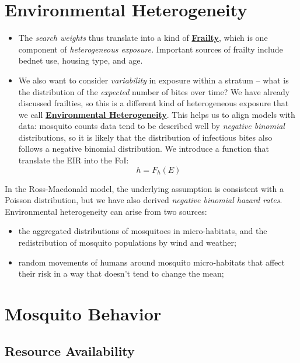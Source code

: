 \documentclass[
]{book}
\begin{document}
\hypertarget{environmental-heterogeneity}{%
\section{Environmental Heterogeneity}\label{environmental-heterogeneity}}

\begin{itemize}
\item
  The \emph{search weights} thus translate into a kind of \textbf{\protect\hyperlink{frailtyCh}{Frailty}}, which is one component of \emph{heterogeneous exposure.} Important sources of frailty include bednet use, housing type, and age.
\item
  We also want to consider \emph{variability} in exposure within a stratum -- what is the distribution of the \emph{expected} number of bites over time? We have already discussed frailties, so this is a different kind of heterogeneous exposure that we call \textbf{\protect\hyperlink{environmentalHeterogeneity}{Environmental Heterogeneity}}. This helps us to align models with data: mosquito counts data tend to be described well by \emph{negative binomial} distributions, so it is likely that the distribution of infectious bites also follows a negative binomial distribution. We introduce a function that translate the EIR into the FoI:
  \[h=F_h(E)\]
\end{itemize}

In the Ross-Macdonald model, the underlying assumption is consistent with a Poisson distribution, but we have also derived \emph{negative binomial hazard rates}. Environmental heterogeneity can arise from two sources:

\begin{itemize}
\item
  the aggregated distributions of mosquitoes in micro-habitats, and the redistribution of mosquito populations by wind and weather;
\item
  random movements of humans around mosquito micro-habitats that affect their risk in a way that doesn't tend to change the mean;
\end{itemize}

\hypertarget{mosquito-behavior}{%
\section{Mosquito Behavior}\label{mosquito-behavior}}

\hypertarget{resource-availability}{%
\subsection{Resource Availability}\label{resource-availability}}
\end{document}
